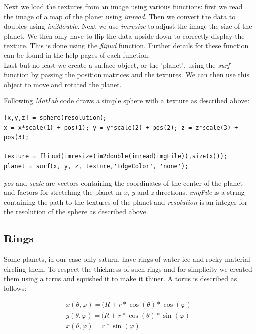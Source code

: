 Next we load the textures from an image using various \matlab{} functions: first we read the image of a map of the planet using {\em imread}. Then we convert the data to doubles using {\em im2double}. Next we use {\em imresize} to adjust the image the size of the planet. We then only have to flip the data upside down to correctly display the texture. This is done using the {\em flipud} function. Further details for these function can be found in the help pages of each function.\\

Last but no least we create a surface object, or the 'planet', using the {\em surf} function by passing the position matrices and the textures. We can then use this object to move and rotated the planet.

Following {\em MatLab} code draws a simple sphere with a texture as described above:
\begin{framed}\begin{verbatim}
[x,y,z] = sphere(resolution);
x = x*scale(1) + pos(1); y = y*scale(2) + pos(2); z = z*scale(3) + pos(3);

texture = flipud(imresize(im2double(imread(imgFile)),size(x)));
planet = surf(x, y, z, texture,'EdgeColor', 'none');
\end{verbatim}\end{framed}
{\em pos} and {\em scale} are vectors containing the coordinates of the center of the planet and factors for stretching the planet in {\em x}, {\em y} and {\em z} directions. {\em imgFile} is a string containing the path to the textures of the planet and {\em resolution} is an integer for the resolution of the sphere as described above.

\subsection{Rings}
Some planets, in our case only saturn, have rings of water ice and rocky material circling them. To respect the thickness of such rings and for simplicity we created them using a torus and squished it to make it thiner. A torus is described as follows:

\begin{align*}
x(\theta, \varphi) = (R + r*\cos(\theta) * \cos(\varphi)\\
y(\theta, \varphi) = (R + r*\cos(\theta) * \sin(\varphi)\\
x(\theta, \varphi) = r*\sin(\varphi)
\end{align*}

